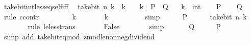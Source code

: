 \begin{isabellebody}
\isanewline
%
\endisadelimproof
\isanewline
{}\isamarkupfalse%
\ take{\isacharunderscore}{\kern0pt}bit{\isacharunderscore}{\kern0pt}int{\isacharunderscore}{\kern0pt}less{\isacharunderscore}{\kern0pt}eq{\isacharunderscore}{\kern0pt}self{\isacharunderscore}{\kern0pt}iff{\isacharcolon}{\kern0pt}\isanewline
\ \ {\isacartoucheopen}take{\isacharunderscore}{\kern0pt}bit\ n\ k\ {\isasymle}\ k\ {\isasymlongleftrightarrow}\ {}\ {\isasymle}\ k{\isacartoucheclose}\ {\isacharparenleft}{\kern0pt}\ {\isacartoucheopen}{\isacharquery}{\kern0pt}P\ {\isasymlongleftrightarrow}\ {\isacharquery}{\kern0pt}Q{\isacartoucheclose}{\isacharparenright}{\kern0pt}\isanewline
\ \ \ k\ {\isacharcolon}{\kern0pt}{\isacharcolon}{\kern0pt}\ int\isanewline
%
\isadelimproof
%
\endisadelimproof
%
\isatagproof
{}\isamarkupfalse%
\isanewline
\ \ \isamarkupfalse%
\ {\isacharquery}{\kern0pt}P\isanewline
\ \ \isamarkupfalse%
\ {\isacharquery}{\kern0pt}Q\isanewline
\ \ \isamarkupfalse%
\ {\isacharparenleft}{\kern0pt}rule\ ccontr{\isacharparenright}{\kern0pt}\isanewline
\ \ \ \ \isamarkupfalse%
\ {\isacartoucheopen}{\isasymnot}\ {}\ {\isasymle}\ k{\isacartoucheclose}\isanewline
\ \ \ \ \isamarkupfalse%
\ \isamarkupfalse%
\ {\isacartoucheopen}k\ {\isacharless}{\kern0pt}\ {}{\isacartoucheclose}\isanewline
\ \ \ \ \ \ \isamarkupfalse%
\ simp\isanewline
\ \ \ \ \isamarkupfalse%
\ {\isacartoucheopen}{\isacharquery}{\kern0pt}P{\isacartoucheclose}\isanewline
\ \ \ \ \isamarkupfalse%
\ {\isacartoucheopen}take{\isacharunderscore}{\kern0pt}bit\ n\ k\ {\isacharless}{\kern0pt}\ {}{\isacartoucheclose}\isanewline
\ \ \ \ \ \ \isamarkupfalse%
\ {\isacharparenleft}{\kern0pt}rule\ le{\isacharunderscore}{\kern0pt}less{\isacharunderscore}{\kern0pt}trans{\isacharparenright}{\kern0pt}\isanewline
\ \ \ \ \isamarkupfalse%
\ \isamarkupfalse%
\ False\isanewline
\ \ \ \ \ \ \isamarkupfalse%
\ simp\isanewline
\ \ \isamarkupfalse%
\isanewline
{}\isamarkupfalse%
\isanewline
\ \ \isamarkupfalse%
\ {\isacharquery}{\kern0pt}Q\isanewline
\ \ \isamarkupfalse%
\ \isamarkupfalse%
\ {\isacharquery}{\kern0pt}P\isanewline
\ \ \ \ \isamarkupfalse%
\ {\isacharparenleft}{\kern0pt}simp\ add{\isacharcolon}{\kern0pt}\ take{\isacharunderscore}{\kern0pt}bit{\isacharunderscore}{\kern0pt}eq{\isacharunderscore}{\kern0pt}mod\ zmod{\isacharunderscore}{\kern0pt}le{\isacharunderscore}{\kern0pt}nonneg{\isacharunderscore}{\kern0pt}dividend{\isacharparenright}{\kern0pt}\isanewline

\end{isabellebody}
